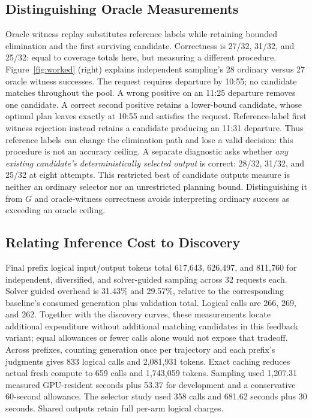 \documentclass[a4paper,twoside]{article}
\begin{document}
\subsection{Distinguishing Oracle Measurements}

Oracle witness replay substitutes reference labels while retaining bounded elimination and the first surviving candidate. Correctness is 27/32, 31/32, and 25/32: equal to coverage totals here, but measuring a different procedure.
Figure~\ref{fig:worked} (right) explains independent sampling's 28 ordinary versus 27 oracle witness successes. The request requires departure by 10:55; no candidate matches throughout the pool. A wrong positive on an 11:25 departure removes one candidate. A correct second positive retains a lower-bound candidate, whose optimal plan leaves exactly at 10:55 and satisfies the request. Reference-label first witness rejection instead retains a candidate producing an 11:31 departure. Thus reference labels can change the elimination path and lose a valid decision: this procedure is not an accuracy ceiling.
A separate diagnostic asks whether \emph{any existing candidate's deterministically selected output} is correct: 28/32, 31/32, and 25/32 at eight attempts. This restricted best of candidate outputs measure is neither an ordinary selector nor an unrestricted planning bound. Distinguishing it from $G$ and oracle-witness correctness avoids interpreting ordinary success as exceeding an oracle ceiling.

\subsection{Relating Inference Cost to Discovery}

Final prefix logical input/output tokens total 617,643, 626,497, and 811,760 for independent, diversified, and solver-guided sampling across 32 requests each. Solver guided overhead is 31.43\% and 29.57\%, relative to the corresponding baseline's consumed generation plus validation total. Logical calls are 266, 269, and 262. Together with the discovery curves, these measurements locate additional expenditure without additional matching candidates in this feedback variant; equal allowances or fewer calls alone would not expose that tradeoff.
Across prefixes, counting generation once per trajectory and each prefix's judgments gives 833 logical calls and 2,081,931 tokens. Exact caching reduces actual fresh compute to 659 calls and 1,743,059 tokens. Sampling used 1,207.31 measured GPU-resident seconds plus 53.37 for development and a conservative 60-second allowance. The selector study used 358 calls and 681.62 seconds plus 30 seconds. Shared outputs retain full per-arm logical charges.
\end{document}
